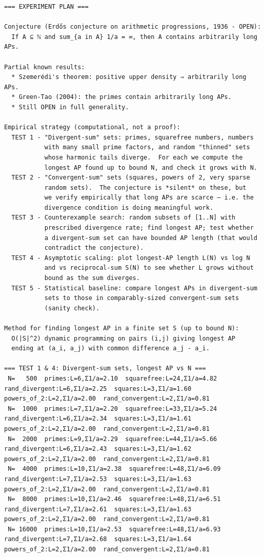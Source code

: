 \documentclass[11pt]{article}
\begin{document}
\begin{lstlisting}
=== EXPERIMENT PLAN ===

Conjecture (Erdős conjecture on arithmetic progressions, 1936 - OPEN):
  If A ⊆ ℕ and sum_{a in A} 1/a = ∞, then A contains arbitrarily long APs.

Partial known results:
  * Szemerédi's theorem: positive upper density ⇒ arbitrarily long APs.
  * Green-Tao (2004): the primes contain arbitrarily long APs.
  * Still OPEN in full generality.

Empirical strategy (computational, not a proof):
  TEST 1 - "Divergent-sum" sets: primes, squarefree numbers, numbers
           with many small prime factors, and random "thinned" sets
           whose harmonic tails diverge.  For each we compute the
           longest AP found up to bound N, and check it grows with N.
  TEST 2 - "Convergent-sum" sets (squares, powers of 2, very sparse
           random sets).  The conjecture is *silent* on these, but
           we verify empirically that long APs are scarce — i.e. the
           divergence condition is doing meaningful work.
  TEST 3 - Counterexample search: random subsets of [1..N] with
           prescribed divergence rate; find longest AP; test whether
           a divergent-sum set can have bounded AP length (that would
           contradict the conjecture).
  TEST 4 - Asymptotic scaling: plot longest-AP length L(N) vs log N
           and vs reciprocal-sum S(N) to see whether L grows without
           bound as the sum diverges.
  TEST 5 - Statistical baseline: compare longest APs in divergent-sum
           sets to those in comparably-sized convergent-sum sets
           (sanity check).

Method for finding longest AP in a finite set S (up to bound N):
  O(|S|^2) dynamic programming on pairs (i,j) giving longest AP
  ending at (a_i, a_j) with common difference a_j - a_i.

=== TEST 1 & 4: Divergent-sum sets, longest AP vs N ===
 N=   500  primes:L=6,Σ1/a=2.10  squarefree:L=24,Σ1/a=4.82  rand_divergent:L=6,Σ1/a=2.25  squares:L=3,Σ1/a=1.60  powers_of_2:L=2,Σ1/a=2.00  rand_convergent:L=2,Σ1/a=0.81
 N=  1000  primes:L=7,Σ1/a=2.20  squarefree:L=33,Σ1/a=5.24  rand_divergent:L=6,Σ1/a=2.34  squares:L=3,Σ1/a=1.61  powers_of_2:L=2,Σ1/a=2.00  rand_convergent:L=2,Σ1/a=0.81
 N=  2000  primes:L=9,Σ1/a=2.29  squarefree:L=44,Σ1/a=5.66  rand_divergent:L=6,Σ1/a=2.43  squares:L=3,Σ1/a=1.62  powers_of_2:L=2,Σ1/a=2.00  rand_convergent:L=2,Σ1/a=0.81
 N=  4000  primes:L=10,Σ1/a=2.38  squarefree:L=48,Σ1/a=6.09  rand_divergent:L=7,Σ1/a=2.53  squares:L=3,Σ1/a=1.63  powers_of_2:L=2,Σ1/a=2.00  rand_convergent:L=2,Σ1/a=0.81
 N=  8000  primes:L=10,Σ1/a=2.46  squarefree:L=48,Σ1/a=6.51  rand_divergent:L=7,Σ1/a=2.61  squares:L=3,Σ1/a=1.63  powers_of_2:L=2,Σ1/a=2.00  rand_convergent:L=2,Σ1/a=0.81
 N= 16000  primes:L=10,Σ1/a=2.53  squarefree:L=48,Σ1/a=6.93  rand_divergent:L=7,Σ1/a=2.68  squares:L=3,Σ1/a=1.64  powers_of_2:L=2,Σ1/a=2.00  rand_convergent:L=2,Σ1/a=0.81


\end{lstlisting}
\end{document}
